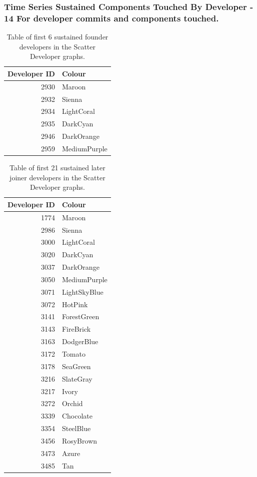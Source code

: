\subsubsection{Time Series Sustained Components Touched By Developer - 14 For developer commits and components touched.} 
\begin{table}[H]
\centering
\caption{Table of first 6 sustained founder developers in the Scatter Developer graphs. } 
\label{tab:14first_developerssustained_founder}
\begin{tabular}{rl}
\toprule
\textbf{Developer ID} & \textbf{Colour} \\ 
\midrule
2930 & \color{Maroon}Maroon \\ 
2932 & \color{Sienna}Sienna \\ 
2934 & \color{LightCoral}LightCoral \\ 
2935 & \color{DarkCyan}DarkCyan \\ 
2946 & \color{DarkOrange}DarkOrange \\ 
2959 & \color{MediumPurple}MediumPurple \\ 
\bottomrule
\end{tabular}
\end{table}
\newpage 
\begin{table}[H]
\centering
\caption{Table of first 21 sustained later joiner developers in the Scatter Developer graphs. } 
\label{tab:14first_developerssustained_later_joiner}
\begin{tabular}{rl}
\toprule
\textbf{Developer ID} & \textbf{Colour} \\ 
\midrule
1774 & \color{Maroon}Maroon \\ 
2986 & \color{Sienna}Sienna \\ 
3000 & \color{LightCoral}LightCoral \\ 
3020 & \color{DarkCyan}DarkCyan \\ 
3037 & \color{DarkOrange}DarkOrange \\ 
3050 & \color{MediumPurple}MediumPurple \\ 
3071 & \color{LightSkyBlue}LightSkyBlue \\ 
3072 & \color{HotPink}HotPink \\ 
3141 & \color{ForestGreen}ForestGreen \\ 
3143 & \color{FireBrick}FireBrick \\ 
3163 & \color{DodgerBlue}DodgerBlue \\ 
3172 & \color{Tomato}Tomato \\ 
3178 & \color{SeaGreen}SeaGreen \\ 
3216 & \color{SlateGray}SlateGray \\ 
3217 & \color{Ivory}Ivory \\ 
3272 & \color{Orchid}Orchid \\ 
3339 & \color{Chocolate}Chocolate \\ 
3354 & \color{SteelBlue}SteelBlue \\ 
3456 & \color{RosyBrown}RosyBrown \\ 
3473 & \color{Azure}Azure \\ 
3485 & \color{Tan}Tan \\ 
\bottomrule
\end{tabular}
\end{table}
